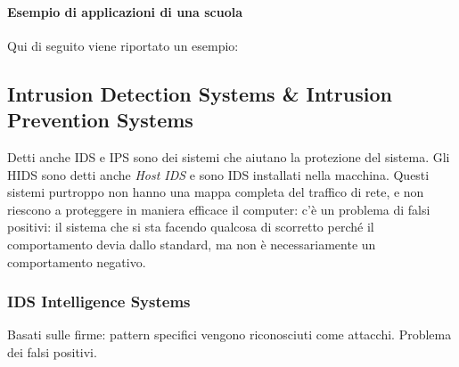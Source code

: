 \paragraph*{Esempio di applicazioni di una scuola}

Qui di seguito viene riportato un esempio:

\begin{table}[H]
\centering
{}
\caption{Un esempio di diversi canali di accesso logici per una infrastruttura
universitaria}
\end{table}

\subsection{Intrusion Detection Systems \& Intrusion Prevention Systems}

Detti anche IDS e IPS sono dei sistemi che aiutano la protezione del sistema.
Gli HIDS sono detti anche \textit{Host IDS} e sono IDS installati nella
macchina. Questi sistemi purtroppo non hanno una mappa completa del traffico di
rete, e non riescono a proteggere in maniera efficace il computer: c'è un
problema di falsi positivi: il sistema che si sta facendo qualcosa di scorretto
perché il comportamento devia dallo standard, ma non è necessariamente un
comportamento negativo.

\subsubsection{IDS Intelligence Systems}

Basati sulle firme: pattern specifici vengono riconosciuti come attacchi.
Problema dei falsi positivi.

